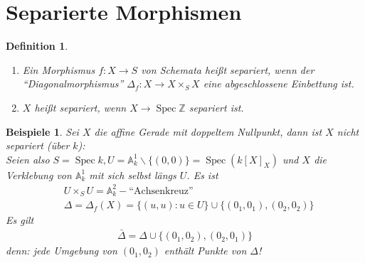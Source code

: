 \documentclass[a4paper,oneside]{scrbook}
\theoremstyle{break}
\newtheorem{Def}{Definition}[section]
\theoremstyle{nonumberbreak}
\newtheorem{nnBsp}{Beispiele}
\theoremstyle{nonumberplain}
\theoremstyle{break}
\newcommand{\Spec}{%
	\ensuremath{\operatorname{Spec}}%
}
\DeclareMathOperator{\id}{id}
\begin{document}
\section{Separierte Morphismen}
\begin{Def}
  \label{def:7.1}
  \begin{enumerate}
  \item Ein Morphismus $f:X\to S$ von Schemata heißt \emph{separiert},  wenn der ``Diagonalmorphismus'' $\Delta_f:X\to X\times_S X$ 
    eine abgeschlossene Einbettung ist.
    \begin{center}
    \end{center}
  \item $X$ heißt \emph{separiert}, wenn $X\to \Spec \mathbb Z$ separiert ist.
  \end{enumerate}
\end{Def}

\begin{nnBsp}
  Sei $X$ die affine Gerade mit doppeltem Nullpunkt, dann ist $X$ nicht separiert (über $k$): \\
  Seien also $S=\Spec k, U=\mathbb A_k^1\backslash\{(0,0)\}=\Spec(k[X]_X)$ und $X$ die Verklebung von $\mathbb A_k^1$ mit sich selbst längs $U$. 
  Es ist
  \begin{align*}
    & U\times_S U=\mathbb A_k^2-\text{``Achsenkreuz''} \\
    & \Delta=\Delta_f(X)=\{(u,u):u\in U\}\cup\{(0_1,0_1),(0_2,0_2)\}
  \end{align*}
  Es gilt
  \begin{align*}
    \bar{\Delta}=\Delta\cup\{(0_1,0_2),(0_2,0_1)\}
  \end{align*}
  denn: jede Umgebung von $(0_1,0_2)$ enthält Punkte von $\Delta$!
\end{nnBsp}
\end{document}
